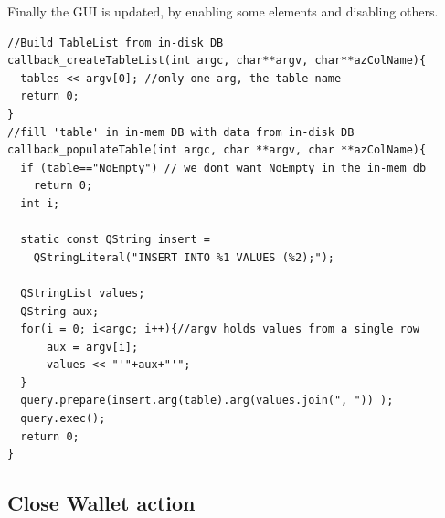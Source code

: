 Finally the GUI is updated, by enabling some elements and disabling others.

\begin{lstlisting}[style=customc, float=htb, caption={Callback functions for Sqlite3 SELECT}, label = {lis:callback}]
//Build TableList from in-disk DB
callback_createTableList(int argc, char**argv, char**azColName){ 
  tables << argv[0]; //only one arg, the table name
  return 0;
}
//fill 'table' in in-mem DB with data from in-disk DB
callback_populateTable(int argc, char **argv, char **azColName){ 
  if (table=="NoEmpty") // we dont want NoEmpty in the in-mem db
    return 0;
  int i;  

  static const QString insert = 
    QStringLiteral("INSERT INTO %1 VALUES (%2);");
  
  QStringList values;
  QString aux;
  for(i = 0; i<argc; i++){//argv holds values from a single row 
      aux = argv[i];
      values << "'"+aux+"'"; 
  }
  query.prepare(insert.arg(table).arg(values.join(", ")) );
  query.exec();
  return 0;
}
\end{lstlisting}


\subsection{Close Wallet action}

